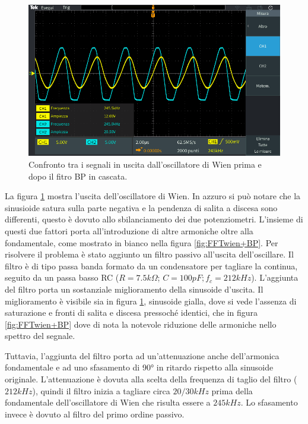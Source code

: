 \documentclass[titlepage]{report}
\begin{document}
	\begin{figure}[H]
		\centering
		\includegraphics[scale=0.5]{Immagini/osc_wien+bp210k.PNG}
		\caption{Confronto tra i segnali in uscita dall'oscillatore di Wien prima e dopo il fitro BP in cascata.}
		\label{fig:SINwien+BP}
	\end{figure}

	La figura \ref{fig:SINwien+BP} mostra l'uscita dell'oscillatore di Wien. In azzuro si può notare che la sinusioide satura sulla parte negativa e la pendenza di salita a discesa sono differenti, questo è dovuto allo sbilanciamento dei due potenziometri. L'insieme di questi due fattori porta all'introduzione di altre armoniche oltre alla fondamentale, come mostrato in bianco nella figura \ref{fig:FFTwien+BP}.
	Per risolvere il problema è stato aggiunto un filtro passivo all'uscita dell'oscillare. Il filtro è di tipo passa banda formato da un condensatore per tagliare la continua, seguito da un passa basso RC ($R = 7.5k\Omega$; $C = 100pF; f_c = 212kHz$).
	L'aggiunta del filtro porta un sostanziale miglioramento della sinusoide d'uscita. Il miglioramento è visibile sia in figura \ref{fig:SINwien+BP}, sinusoide gialla, dove si vede l'assenza di saturazione e fronti di salita e discesa pressoché identici, che in figura \ref{fig:FFTwien+BP} dove di nota la notevole riduzione delle armoniche nello spettro del segnale.

	Tuttavia, l'aggiunta del filtro porta ad un'attenuazione anche dell'armonica fondamentale e ad uno sfasamento di 90° in ritardo rispetto alla sinusoide originale. L'attenuazione è dovuta alla scelta della frequenza di taglio del filtro ($212kHz$), quindi il filtro inizia a tagliare circa $20/30kHz$ prima della fondamentale dell'oscillatore di Wien che risulta essere a $245kHz$. Lo sfasamento invece è dovuto al filtro del primo ordine passivo.
\end{document}
